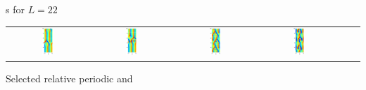 \documentclass{theo1poster}[2003/04/25]
\begin{document}
\begin{poster}{3}
\begin{sheet}{\Rpo s for $L=22$}
\begin{center}
\begin{tabular}{cccccc}
\includegraphics[width=0.15\textwidth]{../../figs/ks22rpo059.9-05.44.eps}\hspace{-3ex} &
\includegraphics[width=0.15\textwidth]{../../figs/ks22rpo084.4-05.51.eps}\hspace{-3ex} &
\includegraphics[width=0.15\textwidth]{../../figs/ks22rpo064.7-00.00.eps}\hspace{-3ex} &
\includegraphics[width=0.15\textwidth]{../../figs/ks22rpo070.3-00.00.eps}
\end{tabular}
\end{center}
Selected relative periodic and

\end{sheet}
\end{poster}
\end{document}
